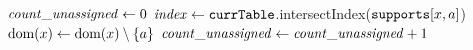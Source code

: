        \label{line:filterDom:0}
      \STATE $\mathit{count\_unassigned} \leftarrow 0$ \label{line:filterDom:1}
       \label{line:filterDom:2}
             \label{line:filterDom:3}
                  \STATE $\mathit{index} \leftarrow \texttt{currTable}$.intersectIndex($\texttt{supports}[x,a]$) \label{line:filterDom:4}
                   \label{line:filterDom:5}
                        \STATE {}  \label{line:filterDom:6}
                  \ELSE
                        \STATE $\text{dom}({x}) \leftarrow \text{dom}({x}) \setminus \left\{a\right\}$ \label{line:filterDom:7}
                  \ENDIF
             \ENDFOREACH
              \label{line:filterDom:8}
                 \STATE $\mathit{count\_unassigned} \leftarrow \mathit{count\_unassigned} + 1$\label{line:filterDom:9}
             \ENDIF

      \ENDFOREACH
       \label{line:filterDom:10}
         \label{line:filterDom:11}
      \ELSE
         \label{line:filterDom:12}
      \ENDIF
      \Endfunc
